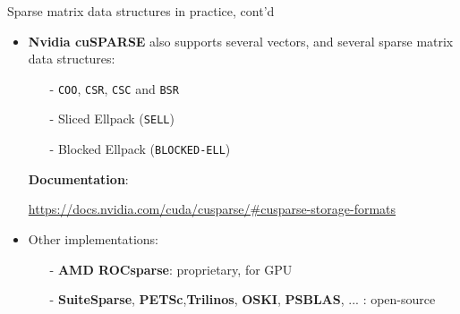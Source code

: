 \documentclass[t,usepdftitle=false]{beamer}
\begin{document}
\begin{frame}[fragile]{Sparse matrix data structures in practice, cont'd}
\begin{itemize}
\item \textbf{Nvidia cuSPARSE} also supports several vectors, and several sparse matrix data structures:
\begin{itemize}\normalsize
\item[-] \texttt{COO}, \texttt{CSR}, \texttt{CSC} and \texttt{BSR}\vspace{.02cm}
\item[-] Sliced Ellpack (\texttt{SELL})\vspace{.02cm}
\item[-] Blocked Ellpack (\texttt{BLOCKED-ELL})
\end{itemize}
\textbf{Documentation}:
\begin{center}\small
\url{https://docs.nvidia.com/cuda/cusparse/#cusparse-storage-formats}\vspace{.2cm}
\end{center}
\item Other implementations:
\begin{itemize}\normalsize
\item[-] \textbf{AMD ROCsparse}: proprietary, for GPU\vspace{.05cm}
\item[-] \textbf{SuiteSparse}, \textbf{PETSc},\textbf{Trilinos}, \textbf{OSKI}, \textbf{PSBLAS}, ... : open-source
\end{itemize}
\end{itemize}
\end{frame}
\end{document}
